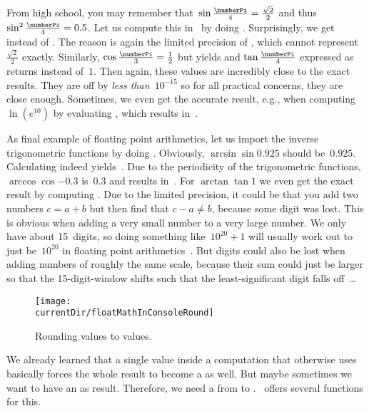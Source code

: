 From high school, you may remember that~$\sin{\frac{\numberPi}{4}}=\frac{\sqrt{2}}{2}$ and thus~$\sin^2{\frac{\numberPi}{4}}=0.5$.
Let us compute this in \python\ by doing .
Surprisingly, we get  instead of .
The reason is again the limited precision of , which cannot represent~$\frac{\sqrt{2}}{2}$ exactly.
Similarly, $\cos{\frac{\numberPi}{3}}=\frac{1}{2}$ but  yields  and $\tan{\frac{\numberPi}{4}}$ expressed as  returns  instead of~$1$.
Then again, these values are incredibly close to the exact results.
They are off by \emph{less than~$10^{-15}$} so for all practical concerns, they are close enough.
Sometimes, we even get the accurate result, e.g., when computing $\ln(e^{10})$ by evaluating , which results in~.

As final example of floating point arithmetics, let us import the inverse trigonometric functions by doing .
Obviously, $\arcsin{\sin{0.925}}$ should be~$0.925$.
Calculating  indeed yields~.
Due to the periodicity of the trigonometric functions, $\arccos{\cos{-0.3}}$ is~$0.3$ and  results in~.
For $\arctan{\tan{1}}$ we even get the exact result  by computing .%
%
%
%
Due to the limited precision, it could be that you add two numbers $c=a+b$ but then find that $c-a\neq b$, because some digit was lost. %
This is obvious when adding a very small number to a very large number.
We only have about 15~digits, so doing something like~$10^{20} + 1$ will usually work out to just be~$10^{20}$ in floating point arithmetics~\cite{PTVF2007NRTAOSC:EAAS}.
But digits could also be lost when adding numbers of roughly the same scale, because their sum could just be larger so that the 15-digit-window shifts such that the least-significant digit falls off~\cite{BHK2006CNFCMEARFCS:NS}{\dots}%
%
\endhsection%
%
%
%
\begin{figure}%
\centering%
\texttt{[image: \\currentDir/floatMathInConsoleRound]}%
\caption{Rounding  values to  values.}%
\label{fig:floatMathInConsoleRound}%
\end{figure}%
%
We already learned that a single  value inside a computation that otherwise uses  basically forces the whole result to become a  as well.
But maybe sometimes we want to have an  as result.
Therefore, we need a  from  to .
\python\ offers several functions for this.

